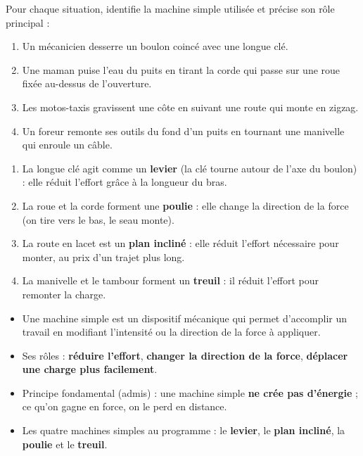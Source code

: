 \documentclass[11pt]{article}
\newcommand{\cle}[1]{{\popxbold\color{popdark}#1}}
\begin{document}
\begin{exercice}
Pour chaque situation, identifie la machine simple utilisée et précise son rôle principal :
\begin{enumerate}
\item Un mécanicien desserre un boulon coincé avec une longue clé.
\item Une maman puise l'eau du puits en tirant la corde qui passe sur une roue fixée au-dessus de l'ouverture.
\item Les motos-taxis gravissent une côte en suivant une route qui monte en zigzag.
\item Un foreur remonte ses outils du fond d'un puits en tournant une manivelle qui enroule un câble.
\end{enumerate}
\end{exercice}

\begin{corrige}[Exercice 1]
\begin{enumerate}
\item La longue clé agit comme un \textbf{levier} (la clé tourne autour de l'axe du boulon) : elle réduit l'effort grâce à la longueur du bras.
\item La roue et la corde forment une \textbf{poulie} : elle change la direction de la force (on tire vers le bas, le seau monte).
\item La route en lacet est un \textbf{plan incliné} : elle réduit l'effort nécessaire pour monter, au prix d'un trajet plus long.
\item La manivelle et le tambour forment un \textbf{treuil} : il réduit l'effort pour remonter la charge.
\end{enumerate}
\end{corrige}

\begin{aretenir}
\begin{itemize}
\item Une \cle{machine simple} est un dispositif mécanique qui permet d'accomplir un travail en modifiant l'intensité ou la direction de la force à appliquer.
\item Ses rôles : \textbf{réduire l'effort}, \textbf{changer la direction de la force}, \textbf{déplacer une charge plus facilement}.
\item Principe fondamental (admis) : une machine simple \textbf{ne crée pas d'énergie} ; ce qu'on gagne en force, on le perd en distance.
\item Les quatre machines simples au programme : le \textbf{levier}, le \textbf{plan incliné}, la \textbf{poulie} et le \textbf{treuil}.
\end{itemize}
\end{aretenir}
\end{document}
